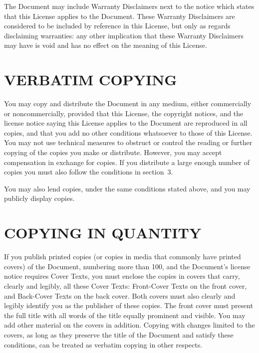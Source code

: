 \documentclass[a4paper,12pt]{book}
\theoremstyle{mes_exemples}	\newtheorem{exemple}[numtho]{Exemple}
\theoremstyle{mes_tho}
\begin{document}
The Document may include Warranty Disclaimers next to the notice which
states that this License applies to the Document.  These Warranty
Disclaimers are considered to be included by reference in this
License, but only as regards disclaiming warranties: any other
implication that these Warranty Disclaimers may have is void and has
no effect on the meaning of this License.

\section{VERBATIM COPYING}

You may copy and distribute the Document in any medium, either
commercially or noncommercially, provided that this License, the
copyright notices, and the license notice saying this License applies
to the Document are reproduced in all copies, and that you add no other
conditions whatsoever to those of this License.  You may not use
technical measures to obstruct or control the reading or further
copying of the copies you make or distribute.  However, you may accept
compensation in exchange for copies.  If you distribute a large enough
number of copies you must also follow the conditions in section~3.

You may also lend copies, under the same conditions stated above, and
you may publicly display copies.

\section{COPYING IN QUANTITY}


If you publish printed copies (or copies in media that commonly have
printed covers) of the Document, numbering more than 100, and the
Document's license notice requires Cover Texts, you must enclose the
copies in covers that carry, clearly and legibly, all these Cover
Texts: Front-Cover Texts on the front cover, and Back-Cover Texts on
the back cover.  Both covers must also clearly and legibly identify
you as the publisher of these copies.  The front cover must present
the full title with all words of the title equally prominent and
visible.  You may add other material on the covers in addition.
Copying with changes limited to the covers, as long as they preserve
the title of the Document and satisfy these conditions, can be treated
as verbatim copying in other respects.
\end{document}
